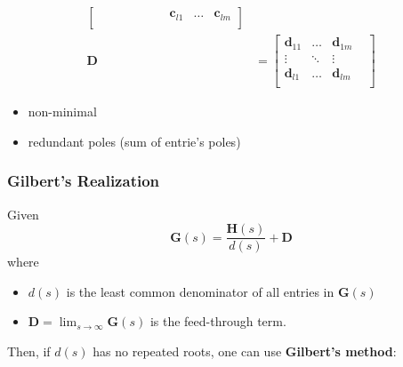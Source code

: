 \begin{align*}
\begin{bmatrix}
                       &                 &                 &       &                 &       &        & \mathbf{c}_{l1} & \dots & \mathbf{c}_{lm} \\
                  \end{bmatrix} \\
    \mathbf{D} & = \begin{bmatrix}
                       \mathbf{d}_{11} & \dots  & \mathbf{d}_{1m}   \\
                       \vdots          & \ddots & \vdots          & \\
                       \mathbf{d}_{l1} & \dots  & \mathbf{d}_{lm} & \\
                   \end{bmatrix}
\end{align*}


\begin{itemize}
    \item non-minimal
    \item redundant poles (sum of entrie's poles)
\end{itemize}

\subsubsection{Gilbert's Realization}

Given
\begin{equation*}
    \mathbf{G}(s)=\frac{\mathbf{H}(s)}{d(s)}+\mathbf{D}
\end{equation*}
where
\begin{itemize}
    \item $d(s)$ is the least common denominator of all entries in $\mathbf{G}(s)$
    \item $\mathbf{D}=\lim_{s\to\infty}\mathbf{G}(s)$ is the feed-through term.
\end{itemize}

\newpar{}
Then, if $d(s)$ has no repeated roots, one can use \textbf{Gilbert's method}:

